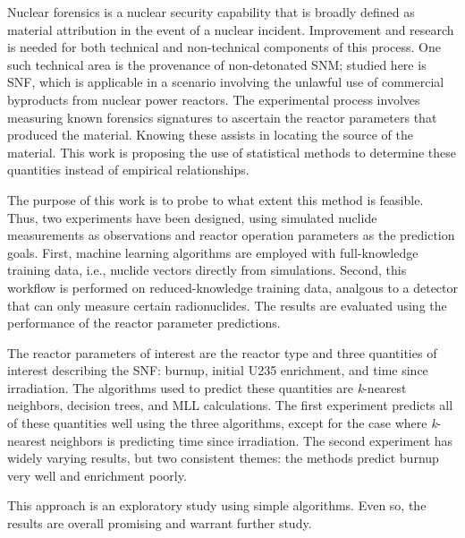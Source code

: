 Nuclear forensics is a nuclear security capability that is broadly defined as
material attribution in the event of a nuclear incident.  Improvement and
research is needed for both technical and non-technical components of this
process.  One such technical area is the provenance of non-detonated \gls{SNM};
studied here is \gls{SNF}, which is applicable in a scenario involving the
unlawful use of commercial byproducts from nuclear power reactors.  The
experimental process involves measuring known forensics signatures to ascertain
the reactor parameters that produced the material. Knowing these assists in
locating the source of the material. This work is proposing the use of
statistical methods to determine these quantities instead of empirical
relationships. 

The purpose of this work is to probe to what extent this method is feasible.
Thus, two experiments have been designed, using simulated nuclide measurements
as observations and reactor operation parameters as the prediction goals.
First, machine learning algorithms are employed with full-knowledge training
data, i.e., nuclide vectors directly from simulations.  Second, this workflow
is performed on reduced-knowledge training data, analgous to a detector that
can only measure certain radionuclides. The results are evaluated using the
performance of the reactor parameter predictions.

The reactor parameters of interest are the reactor type and three quantities of
interest describing the \gls{SNF}: burnup, initial \gls{U235} enrichment, and
time since irradiation. The algorithms used to predict these quantities are
\textit{k}-nearest neighbors, decision trees, and \gls{MLL} calculations. The
first experiment predicts all of these quantities well using the three
algorithms, except for the case where \textit{k}-nearest neighbors is
predicting time since irradiation. The second experiment has widely varying
results, but two consistent themes: the methods predict burnup very well and
enrichment poorly.

This approach is an exploratory study using simple algorithms. Even so, the
results are overall promising and warrant further study.

